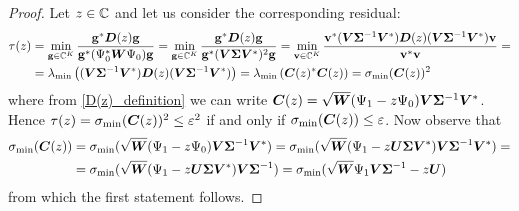 \begin{proof}
Let $z\in\mathbb{C}$ and let us consider the corresponding residual:
\begin{equation*}
\begin{split}
    \tau(z) &= \min_{\vb{g}\in\mathbb{C}^K} \frac{\vb{g}^*\vb*{D}(z)\vb{g}}{\vb{g}^*(\Psi_0^*\vb*{W}\Psi_0)\vb{g}} = \min_{\vb{g}\in\mathbb{C}^K} \frac{\vb{g}^*\vb*{D}(z)\vb{g}}{\vb{g}^*(\vb*{V}\bm{\Sigma}\vb*{V}^*)^2\vb{g}} =  \min_{\vb{v}\in\mathbb{C}^K} \frac{\vb{v}^*(\vb*{V}\bm{\Sigma}^{-1}\vb*{V}^*)\vb*{D}(z)(\vb*{V}\bm{\Sigma}^{-1}\vb*{V}^*)\vb{v}}{\vb{v}^*\vb{v}} = \\
    &= \lambda_{\min}\left((\vb*{V}\bm{\Sigma}^{-1}\vb*{V}^*)\vb*{D}(z)(\vb*{V}\bm{\Sigma}^{-1}\vb*{V}^*)\right) = \lambda_{\min}\left(\vb*{C}(z)^*\vb*{C}(z)\right) = \sigma_{\min}(\vb*{C}(z))^2
\end{split}
\end{equation*}
where from \eqref{D(z)_definition} we can write $\vb*{C}(z) = \sqrt{\vb*{W}}(\Psi_1 - z\Psi_0)\vb*{V}\bm{\Sigma}^{-1}\vb*{V}^*$. Hence $\tau(z) = \sigma_{\min}(\vb*{C}(z))^2 \leq \varepsilon^2$ if and only if $\sigma_{\min}(\vb*{C}(z)) \leq \varepsilon$. Now observe that
\begin{equation*}
    \begin{split}
        \sigma_{\min}(\vb*{C}(z)) &= \sigma_{\min}(\sqrt{\vb*{W}}(\Psi_1 - z\Psi_0)\vb*{V}\bm{\Sigma}^{-1}\vb*{V}^*) = \sigma_{\min}(\sqrt{\vb*{W}}(\Psi_1 - z\vb*{U}\bm{\Sigma}\vb*{V}^*)\vb*{V}\bm{\Sigma}^{-1}\vb*{V}^*) = \\
        &= \sigma_{\min}(\sqrt{\vb*{W}}(\Psi_1 - z\vb*{U}\bm{\Sigma}\vb*{V}^*)\vb*{V}\bm{\Sigma}^{-1}) = \sigma_{\min}(\sqrt{\vb*{W}}\Psi_1\vb*{V}\bm{\Sigma}^{-1} - z\vb*{U})
    \end{split}
\end{equation*}
from which the first statement follows. 


\end{proof}
